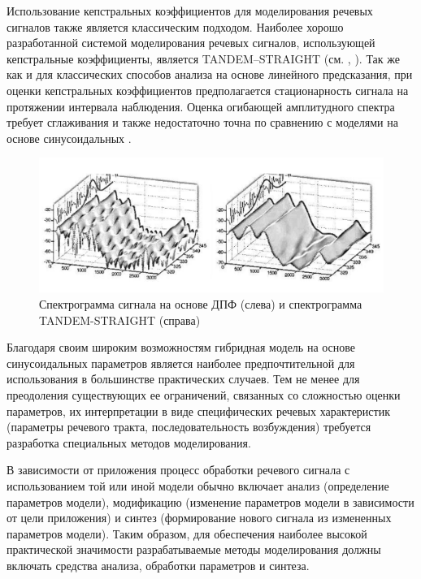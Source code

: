 Использование кепстральных коэффициентов для моделирования речевых сигналов также является классическим подходом. Наиболее хорошо разработанной системой моделирования речевых сигналов, использующей кепстральные коэффициенты, является TANDEM–STRAIGHT (см. , ). Так же как и для классических способов анализа на основе линейного предсказания, при оценки кепстральных коэффициентов предполагается стационарность сигнала на протяжении интервала наблюдения. Оценка огибающей амплитудного спектра требует сглаживания и также недостаточно точна по сравнению с моделями на основе синусоидальных   \textit{}.

\begin{figure}[H]
    \centerline{
        \includegraphics[scale=1.0, width=1.0\textwidth]{author/part4/figures/ch43_fig06_straight-spectrum.png}
    }
    \caption{Спектрограмма сигнала на основе ДПФ (слева) и спектрограмма TANDEM-STRAIGHT (справа)}
    \label{fig:straight-spectrum}
\end{figure}


Благодаря своим широким возможностям гибридная модель на основе синусоидальных параметров является наиболее предпочтительной для использования в большинстве практических случаев. Тем не менее для преодоления существующих ее ограничений, связанных со сложностью оценки параметров, их интерпретации в виде специфических речевых характеристик (параметры речевого тракта, последовательность возбуждения) требуется разработка специальных методов моделирования. 

В зависимости от приложения процесс обработки речевого сигнала с использованием той или иной модели обычно включает анализ (определение параметров модели), модификацию (изменение параметров модели в зависимости от цели приложения) и синтез (формирование нового сигнала из измененных параметров модели). Таким образом, для обеспечения наиболее высокой практической значимости разрабатываемые методы моделирования должны включать средства анализа, обработки параметров и синтеза.

